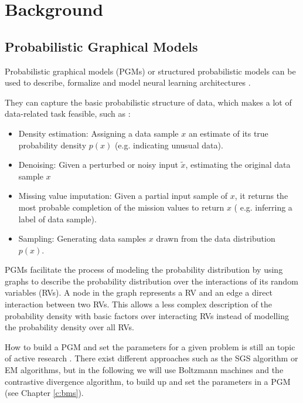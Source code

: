 \chapter{Background} \label{c:backgrnd}

\section{Probabilistic Graphical Models} \label{c:pgms}

Probabilistic graphical models (PGMs) or structured probabilistic models can be used to describe, formalize and model neural learning architectures \cite{Goodfellow-et-al-2016-Book} \cite{Petrovici2016}.

They can capture the basic probabilistic structure of data, which makes a lot of data-related task feasible, such as \cite{Goodfellow-et-al-2016-Book}:
\begin{itemize}

\item Density estimation: Assigning a data sample $x$ an estimate of its true probability density $p(x)$ (e.g. indicating unusual data).

\item Denoising: Given a perturbed or noisy input $\widetilde{x}$,  estimating the original data sample $x$

\item Missing value imputation: Given a partial input sample of $x$, it returns the most probable completion of the mission values to return $x$ ( e.g. inferring a label of data sample).

\item Sampling: Generating data samples $x$ drawn from the data distribution $p(x)$. 

\end{itemize}  

PGMs facilitate the process of modeling the probability distribution by using graphs to describe the probability distribution over the interactions of its random variables (RVs).
A node in the graph represents a RV and an edge a direct interaction between two RVs.
This allows a less complex description of the probability density with basic factors over interacting RVs instead of modelling the probability density over all RVs. 

How to build a PGM and set the parameters for a given problem is still an topic of active research \cite{Ghahramani2002}\cite{Zhou2007}.
There exist different approaches such as the SGS algorithm \cite{Zhou2007} or EM algorithms\cite{Ghahramani2002}, but in the following we will use Boltzmann machines and the contrastive divergence algorithm, to build up and set the parameters in a PGM (see Chapter \ref{c:bms}).

